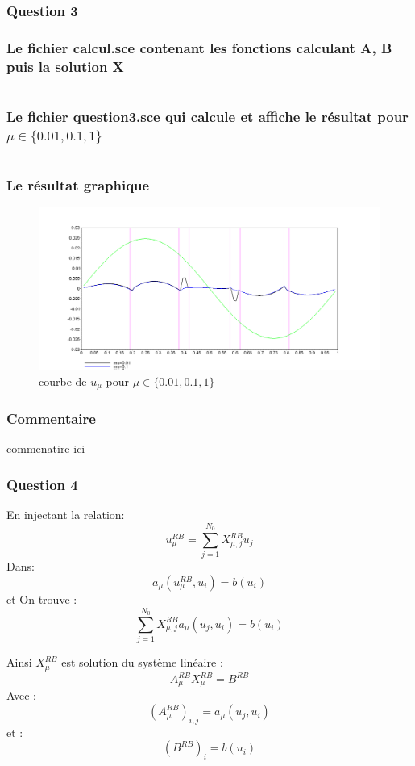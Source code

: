 \documentclass{article}
\newcommand{\Q}[1]{\subsubsection*{Question #1}}
\begin{document}
\Q{3}
\subsubsection*{Le fichier calcul.sce contenant les fonctions calculant A, B puis la solution X}
\inputminted{scilab}{codes/calcul.sce}

\subsubsection*{Le fichier question3.sce qui calcule et affiche le résultat pour $\mu \in \{0.01, 0.1, 1\}$}
\inputminted{scilab}{codes/question3.sce}

\subsubsection*{Le résultat graphique}

\begin{figure}
\centering
\includegraphics[scale=0.25]{img/q3.png}
\caption{courbe de $u_\mu$ pour $\mu \in \{0.01, 0.1, 1\}$}
\end{figure}


\subsubsection*{Commentaire}
commenatire ici

\Q{4}
En injectant la relation:
$$ u_{\mu}^{RB} = \sum_{j=1}^{N_{0}} X_{\mu , j }^{RB} u_{j} $$ 
Dans:
$$ a_{\mu}( u_{\mu}^{RB} , u_{i} ) = b(u_{i}) $$ et 
On trouve : 
$$ \sum_{j=1}^{N_{0}} X_{\mu , j }^{RB} a_{\mu}(u_{j},u_{i}) = b(u_{i}) $$ 

Ainsi $ X_{\mu}^{RB} $ est solution du système linéaire : 
$$ A_{\mu}^{RB}X_{\mu}^{RB} = B^{RB} $$ 
Avec : 
$$ (A_{\mu}^{RB})_{i,j} = a_{\mu}(u_{j},u_{i}) $$
et : 
$$ (B^{RB})_{i} = b(u_{i}) $$
\end{document}

